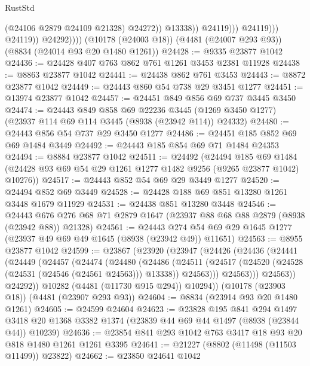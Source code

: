 \begin{lexlean}{RustStd}
\begin{coremodule}
                                    (@24106 @2879 @24109 @21328)
                                    @24272))
                                @13338))
                            @24119)))
                      @24119)))
                @24119))
            @24292))))
    (@10178 (@24003 @18))
    (@4481 (@24007 @293 @93))
    (@8834 (@24014 @93 @20 @1480 @1261))
@24428 := @9335 @23877 @1042
@24436 := @24428 @407 @763 @862 @761 @1261 @3453 @2381 @11928
@24438 := @8863 @23877 @1042
@24441 := @24438 @862 @761 @3453
@24443 := @8872 @23877 @1042
@24449 := @24443 @860 @54 @738 @29 @3451 @1277
@24451 := @13974 @23877 @1042
@24457 := @24451 @849 @856 @69 @737 @3445 @3450
@24474 := @24443
    @849
    @858
    @69
    @22236
    @3445
    (@1269 @3450 @1277)
    (@23937 @114 @69 @114 @3445 (@8938 (@23942 @114)) @24332)
@24480 := @24443 @856 @54 @737 @29 @3450 @1277
@24486 := @24451 @185 @852 @69 @69 @1484 @3449
@24492 := @24443 @185 @854 @69 @71 @1484 @24353
@24494 := @8884 @23877 @1042
@24511 := @24492
    (@24494
      @185
      @69
      @1484
      (@24428 @93 @69 @54 @29 @1261 @1277 @1482 @9256 (@9265 @23877 @1042) @10276))
@24517 := @24443 @852 @54 @69 @29 @3449 @1277
@24520 := @24494 @852 @69 @3449
@24528 := @24428 @188 @69 @851 @13280 @1261 @3448 @1679 @11929
@24531 := @24438 @851 @13280 @3448
@24546 := @24443
    @676
    @276
    @68
    @71
    @2879
    @1647
    (@23937 @88 @68 @88 @2879 (@8938 (@23942 @88)) @21328)
@24561 := @24443 @274 @54 @69 @29 @1645 @1277 (@23937 @49 @69 @49 @1645 (@8938 (@23942 @49)) @11651)
@24563 := @8955 @23877 @1042
@24599 := @23867
    (@23920
      (@23947
        (@24426
          (@24436
            (@24441
              (@24449
                (@24457
                  (@24474
                    (@24480
                      (@24486
                        (@24511
                          (@24517
                            (@24520 (@24528 (@24531 (@24546 (@24561 @24563))) @13338))
                            @24563)))
                      @24563)))
                @24563))
            @24292))
        @10282
        (@4481 (@11730 @915 @294))
        @10294))
    (@10178 (@23903 @18))
    (@4481 (@23907 @293 @93))
@24604 := @8834 (@23914 @93 @20 @1480 @1261)
@24605 := @24599 @24604
@24623 := @23828
    @195
    @841
    @294
    @1497
    @3418
    @20
    @1368
    @3382
    @1374
    (@23839 @44 @69 @44 @1497 (@8938 (@23844 @44)) @10239)
@24636 := @23854 @841 @293 @1042 @763 @3417 @18 @93 @20 @818 @1480 @1261 @1261 @3395
@24641 := @21227 (@8802 (@11498 (@11503 @11499)) @23822)
@24662 := @23850
    @24641
    @1042

\end{coremodule}
\end{lexlean}

